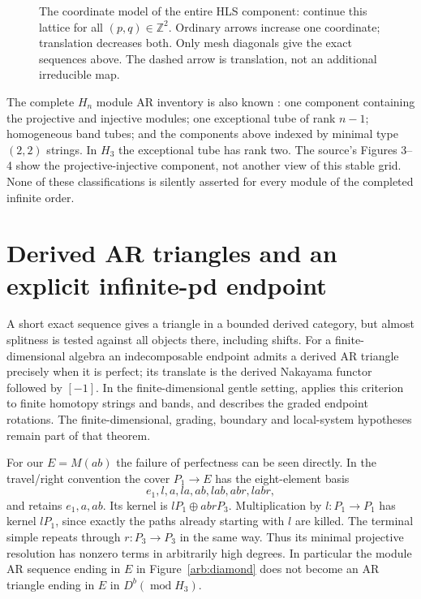 \begin{figure}[htbp]\centering
{}
\caption{The coordinate model of the entire HLS component: continue this
lattice for all $(p,q)\in\mathbb Z^2$. Ordinary arrows increase one coordinate;
translation decreases both. Only mesh diagonals give the exact sequences
above. The dashed arrow is translation, not an additional irreducible map.}
\end{figure}

The complete $H_n$ module AR inventory is also known
\cite[Theorem 3.14]{ARBHLS}: one component containing the projective and injective
modules; one exceptional tube of rank $n-1$; homogeneous band tubes; and the
components above indexed by minimal type $(2,2)$ strings. In $H_3$ the exceptional
tube has rank two. The source's Figures 3--4 show the projective-injective
component, not another view of this stable grid. None of these classifications
is silently asserted for every module of the completed infinite order.

\section[Derived AR triangles]{Derived AR triangles and an explicit infinite-pd endpoint}
A short exact sequence gives a triangle in a bounded derived category, but
almost splitness is tested against all objects there, including shifts.
For a finite-dimensional algebra an indecomposable endpoint admits a derived
AR triangle precisely when it is perfect; its translate is the derived
Nakayama functor followed by $[-1]$. In the finite-dimensional gentle setting,
\cite[Section 5.1]{ARBOPS} applies this criterion to finite homotopy strings and
bands, and describes the graded endpoint rotations. The finite-dimensional,
grading, boundary and local-system hypotheses remain part of that theorem.

For our $E=M(ab)$ the failure of perfectness can be seen directly. In the
travel/right convention the cover $P_1\to E$ has the eight-element basis
\[
 e_1,l,a,la,ab,lab,abr,labr,
\]
and retains $e_1,a,ab$. Its kernel is $lP_1\oplus abrP_3$.
Multiplication by $l:P_1\to P_1$ has kernel $lP_1$, since exactly the paths
already starting with $l$ are killed. The terminal simple repeats through
$r:P_3\to P_3$ in the same way. Thus its minimal projective resolution has
nonzero terms in arbitrarily high degrees. In particular the module AR sequence
ending in $E$ in Figure~\ref{arb:diamond} does not become an AR triangle ending
in $E$ in $D^b(\operatorname{mod}H_3)$.

